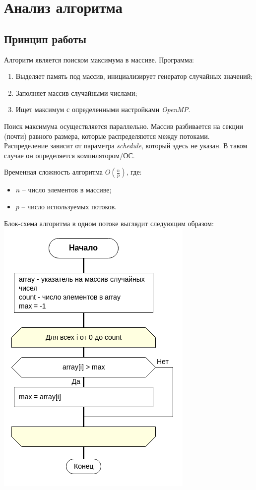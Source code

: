 \section{Анализ алгоритма}

\subsection{Принцип работы}

Алгоритм является поиском максимума в массиве.
Программа:
\begin{enumerate}
    \item Выделяет память под массив, инициализирует генератор случайных значений;
    \item Заполняет массив случайными числами;
    \item Ищет максимум с определенными настройками \textit{OpenMP}.
\end{enumerate}

Поиск максимума осуществляется параллельно. 
Массив разбивается на секции (почти) равного размера, которые распределяются между потоками.
Распределение зависит от параметра \textit{schedule}, который здесь не указан.
В таком случае он определяется компилятором/ОС.

Временная сложность алгоритма $O(\frac{n}{p})$, где:
\begin{itemize}
 \item $n$ -- число элементов в массиве;
 \item $p$ -- число используемых потоков.
\end{itemize}

Блок-схема алгоритма в одном потоке выглядит следующим образом:\\
\includegraphics[scale=0.6]{res/flowchart.png}

